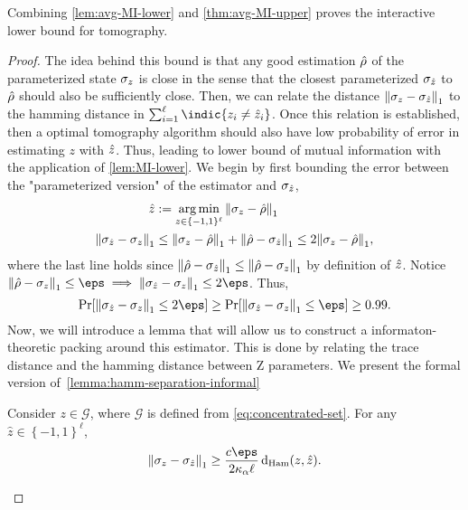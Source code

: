 Combining \cref{lem:avg-MI-lower} and \cref{thm:avg-MI-upper} proves the interactive lower bound for tomography.
\begin{proof}
   The idea behind this bound is that any good estimation ${\hat{\rho}}$ of the parameterized state $\sigma_{z}$ is close in the sense that the closest parameterized $\sigma_{\hat{{z}}}$ to ${\hat{\rho}}$ should also be sufficiently close. Then, we can relate the distance ${\left\|\sigma_{{z}} - \sigma_{\hat{{z}}}\right\|}_{1}$ to the hamming distance in $\sum_{i=1}^\ell \indic{z_i \neq \zest_i}$. Once this relation is established, then a optimal tomography algorithm should also have low probability of error in estimating $z$ with $\hat{{z}}$. Thus, leading to lower bound of mutual information with the application of \cref{lem:MI-lower}. We begin by first bounding the error between the "parameterized version" of the estimator and $\sigma_{\hat{{z}}}$,
   \begin{align*}
        \hat{{z}} &:= \operatorname*{arg\,min}_{{z} \in \{-1,1\}^\ell } {\left\|\sigma_{{z}} - {\hat{\rho}}\right\|}_{1}\\
        {\left\|\sigma_{\hat{{z}}} - \sigma_{{z}}\right\|}_{1} &\leq {\left\|\sigma_{{z}} - {\hat{\rho}}\right\|}_{1} + {\left\|{\hat{\rho}}-\sigma_{\hat{{z}}}\right\|}_{1} \leq 2 {\left\|\sigma_{{z}} - {\hat{\rho}}\right\|}_{1},
   \end{align*}
   where the last line holds since ${\left\|{\hat{\rho}}-\sigma_{\hat{{z}}}\right\|}_{1} \leq {\left\|{\hat{\rho}}-\sigma_{{z}}\right\|}_{1}$ by definition of $\hat{{z}}$. Notice $ \tracenorm{\qest-\sigma_{\ptb}} \leq \eps \implies \tracenorm{\sigma_{\zest} - \sigma_{\ptb}} \leq 2\eps $. Thus, 
   $$\Pr[\tracenorm{\sigma_{\zest} - \sigma_{\ptb}} \leq 2 \eps] \ge \Pr[\tracenorm{\sigma_{\zest} - \sigma_{\ptb}} \leq \eps] \geq 0.99.$$
   Now, we will introduce a lemma that will allow us to construct a informaton-theoretic packing around this estimator. This is done by relating the trace distance and the hamming distance between Z parameters. We present the formal version of~\cref{lemma:hamm-separation-informal}

   \begin{lemma} \label{lemma:hamm-packing}
       Consider $z \in \mathcal{G}$, where $\mathcal{G}$ is defined from \cref{eq:concentrated-set}. For any  $\hat{z} \in \left\{-1,1\right\}^{\ell}$,
       \begin{equation}
           \tracenorm{\sigma_\ptb - \sigma_{\zest}} \geq \frac{c \eps}{2\kappa_\alpha \ell} \ham{\ptb}{\zest}.
       \end{equation}
   \end{lemma}


\end{proof}
